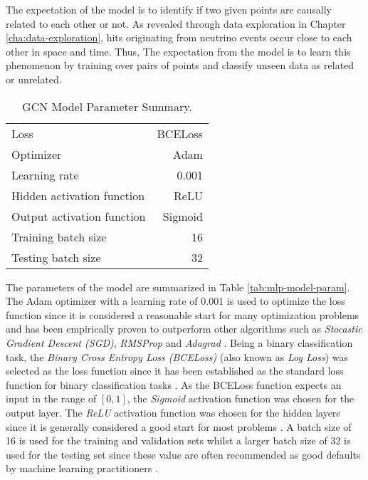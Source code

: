 The expectation of the model is to identify if two given points are
causally related to each other or not. As revealed through data
exploration in Chapter \ref{cha:data-exploration}, hits originating from
neutrino events occur close to each other in space and time. Thus, The
expectation from the model is to learn this phenomenon by training
over pairs of points and classify unseen data as related or unrelated.

\begin{table}[htb]
  \centering
  \caption{GCN Model Parameter Summary.}
  \begin{tabular}{lr}
    \hline
    Loss & BCELoss \\
    Optimizer & Adam \\
    Learning rate & 0.001 \\
    Hidden activation function & ReLU\\
    Output activation function & Sigmoid \\
    Training batch size & 16 \\
    Testing batch size & 32 \\
    \hline
  \end{tabular}
  \label{tab:gcn-model-param}
\end{table}

The parameters of the model are summarized in Table
\ref{tab:mlp-model-param}. The Adam optimizer with a learning rate of
$0.001$ is used to optimize the loss function since it is considered a
reasonable start for many optimization problems and has been
empirically proven to outperform other algorithms such as
\textit{Stocastic Gradient Descent (SGD)}, \textit{RMSProp} and
\textit{Adagrad} \cite{ruder2016overview}. Being a binary
classification task, the \textit{Binary Cross Entropy Loss (BCELoss)}
(also known as \textit{Log Loss}) was selected as the loss function
since it has been established as the standard loss function for binary
classification tasks \cite{painsky2018universality}. As the BCELoss
function expects an input in the range of $[0, 1]$, the
\textit{Sigmoid} activation function was chosen for the output layer.
The \textit{ReLU} activation function was chosen for the hidden layers
since it is generally considered a good start for most problems
\cite{nwankpa2018activation, wang2019learning}. A batch size of 16 is
used for the training and validation sets whilst a larger batch size
of 32 is used for the testing set since these value are often
recommended as good defaults by machine learning practitioners
\cite{bengio2012practical,Goodfellow-et-al-2016}.

